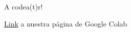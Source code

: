 \documentclass{beamer}
\begin{document}
\begin{frame}{A codea(t)r!}
\begin{block}

\textcolor{blue}{\href{https://colab.research.google.com/drive/1pssmr5FRjDoYxt3-iadaxa-ek3ZmFwPx?usp=sharing}{Link}} a nuestra página de Google Colab	
	
\end{block}
\end{frame}



%
%
%
%
%
\end{document}
